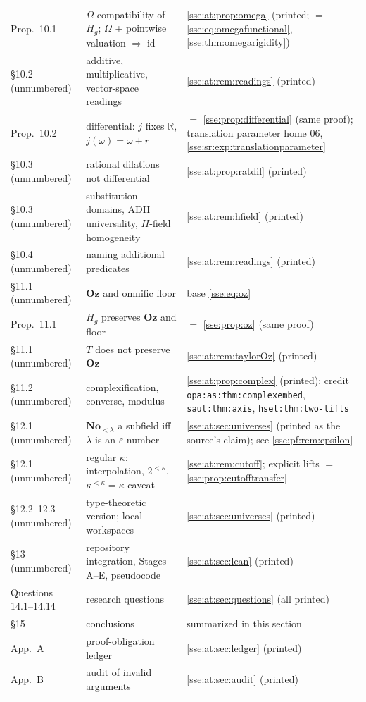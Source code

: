 \documentclass[11pt,a4paper]{article}
\numberwithin{equation}{section}
\theoremstyle{plain}
\theoremstyle{definition}
\theoremstyle{remark}
\newcommand{\No}{\mathbf{No}}
\newcommand{\Oz}{\mathbf{Oz}}
\newcommand{\R}{\mathbb{R}}
\newcommand{\id}{\operatorname{id}}
\newcommand{\lbl}[1]{\nolinkurl{#1}}%
\begin{document}
{\begin{longtable}{P{30mm}P{50mm}P{70mm}}
Prop.~10.1 & $\Omega$-compatibility of $H_g$; $\Omega$ + pointwise valuation $\Rightarrow\id$ & \cref{sse:at:prop:omega} (printed; $=$ \eqref{sse:eq:omegafunctional}, \cref{sse:thm:omegarigidity}) \\
\S10.2 (unnumbered) & additive, multiplicative, vector-space readings & \cref{sse:at:rem:readings} (printed) \\
Prop.~10.2 & differential: $j$ fixes $\R$, $j(\omega)=\omega+r$ & $=$ \cref{sse:prop:differential} (same proof); translation parameter home 06, \cref{sse:sr:exp:translationparameter} \\
\S10.3 (unnumbered) & rational dilations not differential & \cref{sse:at:prop:ratdil} (printed) \\
\S10.3 (unnumbered) & substitution domains, ADH universality, $H$-field homogeneity & \cref{sse:at:rem:hfield} (printed) \\
\S10.4 (unnumbered) & naming additional predicates & \cref{sse:at:rem:readings} (printed) \\
\S11.1 (unnumbered) & $\Oz$ and omnific floor & base \eqref{sse:eq:oz} \\
Prop.~11.1 & $H_g$ preserves $\Oz$ and floor & $=$ \cref{sse:prop:oz} (same proof) \\
\S11.1 (unnumbered) & $T$ does not preserve $\Oz$ & \cref{sse:at:rem:taylorOz} (printed) \\
\S11.2 (unnumbered) & complexification, converse, modulus & \cref{sse:at:prop:complex} (printed); credit \lbl{opa:as:thm:complexembed}, \lbl{saut:thm:axis}, \lbl{hset:thm:two-lifts} \\
\S12.1 (unnumbered) & $\No_{<\lambda}$ a subfield iff $\lambda$ is an $\varepsilon$-number & \cref{sse:at:sec:universes} (printed as the source's claim); see \cref{sse:pf:rem:epsilon} \\
\S12.1 (unnumbered) & regular $\kappa$: interpolation, $2^{<\kappa}$, $\kappa^{<\kappa}=\kappa$ caveat & \cref{sse:at:rem:cutoff}; explicit lifts $=$ \cref{sse:prop:cutofftransfer} \\
\S12.2--12.3 (unnumbered) & type-theoretic version; local workspaces & \cref{sse:at:sec:universes} (printed) \\
\S13 (unnumbered) & repository integration, Stages A--E, pseudocode & \cref{sse:at:sec:lean} (printed) \\
Questions 14.1--14.14 & research questions & \cref{sse:at:sec:questions} (all printed) \\
\S15 & conclusions & summarized in this section \\
App.~A & proof-obligation ledger & \cref{sse:at:sec:ledger} (printed) \\
App.~B & audit of invalid arguments & \cref{sse:at:sec:audit} (printed) \\
\bottomrule
\end{longtable}
}
\end{document}

